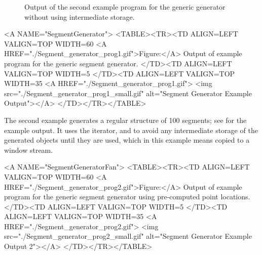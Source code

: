 \begin{ccTexOnly}
\begin{figure}
\begin{minipage}[t]{0.45\textwidth}
      \caption{Output of the second example program for the generic
        generator without using intermediate storage.}
      \label{figureSegmentGeneratorFan}
    \end{minipage}%
  \end{figure}
\end{ccTexOnly}


\begin{ccHtmlOnly}
  <A NAME="SegmentGenerator">
  <TABLE><TR><TD ALIGN=LEFT VALIGN=TOP WIDTH=60%
    <A HREF="./Segment_generator_prog1.gif">Figure:</A>
    Output of example program for the generic segment generator.
  </TD><TD ALIGN=LEFT VALIGN=TOP WIDTH=5%
  </TD><TD ALIGN=LEFT VALIGN=TOP WIDTH=35%
    <A HREF="./Segment_generator_prog1.gif">
        <img src="./Segment_generator_prog1_small.gif" 
             alt="Segment Generator Example Output"></A>
  </TD></TR></TABLE>
\end{ccHtmlOnly}

The second example generates a regular structure of 100 segments; see 
 for the example
output. It uses the %
 iterator,
%
and  %
to avoid any intermediate storage of the generated objects until they are
used, which in this example means copied to a window stream.


\begin{ccHtmlOnly}
  <A NAME="SegmentGeneratorFan">
  <TABLE><TR><TD ALIGN=LEFT VALIGN=TOP WIDTH=60%
    <A HREF="./Segment_generator_prog2.gif">Figure:</A>
    Output of example program for the generic segment generator using
    pre-computed point locations.
  </TD><TD ALIGN=LEFT VALIGN=TOP WIDTH=5%
  </TD><TD ALIGN=LEFT VALIGN=TOP WIDTH=35%
    <A HREF="./Segment_generator_prog2.gif">
        <img src="./Segment_generator_prog2_small.gif" 
             alt="Segment Generator Example Output 2"></A>
  </TD></TR></TABLE>
\end{ccHtmlOnly}


\ccParDims
\cgalColumnLayout



\ccParDims
\beforecprogskip\parskip
{}


